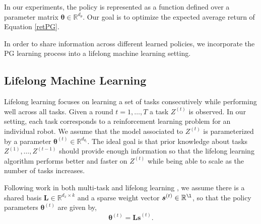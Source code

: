 \documentclass{aamas2016}
\renewcommand{\Re}{\mathbb{R}}
\newcommand{\note}[3]{{\color{#2} [ \ding{42} \textbf{#1:} {\small #3} ]}}
\newcommand{\comEric}[1]{\note{Eric}{blue}{#1}}
\begin{document}
In our experiments, the policy is represented as a function defined over a parameter matrix 
$\boldsymbol{\theta} \in \Re^{d_{\theta}}$. 
Our goal is to optimize the expected average return of Equation \ref{retPG}.


In order to share information across different learned policies, we incorporate the PG learning process into a lifelong machine learning 
setting.





\subsection{Lifelong Machine Learning}


Lifelong learning focuses on learning a set of tasks consecutively while performing well across all tasks. Given a round $t = 1,\dots,T$ a task $Z^{(t)}$ is observed. %
In our setting, each task corresponds to a reinforcement learning problem for an individual robot. We assume that the model associated to $Z^{(t)}$ is parameterized by a parameter $\boldsymbol{\theta}^{(t)} \in \Re^{d_{\theta_{t}}}$. The ideal goal is that prior knowledge about tasks $Z^{(1)},\ldots,Z^{(t-1)}$ should provide enough information so that the lifelong learning algorithm performs better and faster on $Z^{(t)}$ while being able to scale as the number of tasks increases.

Following work in both multi-task \cite{Kumar-2012} and lifelong learning \cite{Ruvolo2013}, we assume there is a shared basis $\boldsymbol{L}\in \Re^{d_{x}\times k}$ and a sparse weight vector $\boldsymbol{s}^{(t)}\in \Re^{\l}$, so that the policy parameters $\boldsymbol{\theta}^{(t)}$
are given by,
\begin{displaymath}
 \boldsymbol{\theta}^{(t)}=\boldsymbol{Ls}^{(t)}.
\end{displaymath}
\end{document}
